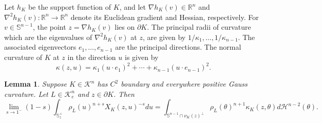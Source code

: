 \documentclass[12pt, oneside,reqno]{amsart}
\numberwithin{equation}{section}
\newtheorem{lemma}[theorem]{Lemma}
\newtheorem{definition and theorem}[theorem]{Definition and Theorem}
\theoremstyle{plain}
\theoremstyle{remark}
\theoremstyle{definition}
\newcommand{\sn}{{\mathbb S}^{n-1}}
\newcommand{\rn}{\mathbb R^n}
\newcommand{\tk}{\mathcal{K}}
\newcommand{\tH}{\mathcal{H}}
\begin{document}
Let $h_K$ be the support function of $K$, and let  $\nabla h_K(v)\in\rn$ and $\nabla^2h_K(v):\rn\rightarrow \rn$ 
denote its Euclidean gradient and Hessian, respectively. For $v\in\sn$, the point $z=\nabla h_K(v)$ lies on $ \partial K$. The principal radii of curvature which are the  eigenvalues of $\nabla^2h_K(v)$ at $z$, are given by $1/\kappa_1,\ldots , 1/\kappa_{n-1}$. The associated eigenvectors $e_1,\ldots, e_{n-1}$ are the principal directions. The normal curvature of $K$ at $z$ in the direction $u$ is given by
\[\kappa(z,u)=\kappa_1 (u\cdot e_1)^2+\cdots +\kappa_{n-1}( u\cdot e_{n-1})^2.\]

\begin{lemma}\label{conv} Suppose $K\in\tk^n$ has $C^2$ boundary and everywhere positive Gauss curvature. Let $L\in\tk_e^n$ and $z\in\partial K$. Then
    \[\lim_{s\rightarrow 1^-}(1-s)\int_{\mathbb S_z^+}\rho_L(u)^{n+ s}X_K(z,u)^{-s}du=\int_{\sn\cap \nu_K(z)^{\perp}}\rho_L(\theta)^{n+1}\kappa_K(z,\theta)d\tH^{n-2}( \theta).\]
\end{lemma}
\end{document}
